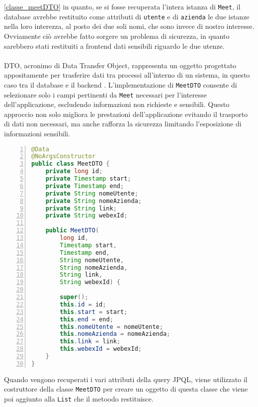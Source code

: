 \ref{classe_meetDTO} in quanto, se si fosse recuperata l'intera istanza di \texttt{Meet}, il database avrebbe restituito come attributi 
di \texttt{utente} e di \texttt{azienda} le due istanze nella loro interezza, al posto dei due soli nomi, che sono invece di nostro interesse. 
Ovviamente ciò avrebbe fatto sorgere un problema di sicurezza, in quanto sarebbero stati restituiti a frontend 
dati sensibili riguardo le due utenze.
\\
\\
DTO, acronimo di Data Transfer Object, rappresenta un oggetto progettato appositamente per trasferire dati tra processi 
all'interno di un sistema, in questo caso tra il database e il backend \cite{DataTransferObject}. L'implementazione di \texttt{MeetDTO} consente di selezionare 
solo i campi pertinenti da \texttt{Meet} necessari per l'interesse dell'applicazione, escludendo informazioni non richieste e sensibili.
Questo approccio non solo migliora le prestazioni dell'applicazione evitando il trasporto di dati non necessari, 
ma anche rafforza la sicurezza limitando l'esposizione di informazioni sensibili.
\begin{lstlisting}[language=java, frame=lines, basicstyle=\ttfamily\scriptsize, numbers=left, 
    label={classe_meetDTO}, caption={Classe MeetDTO}]
@Data
@NoArgsConstructor
public class MeetDTO {
    private long id;
    private Timestamp start;
    private Timestamp end;
    private String nomeUtente;
    private String nomeAzienda;
    private String link;
    private String webexId;
        
    public MeetDTO(
        long id, 
        Timestamp start, 
        Timestamp end, 
        String nomeUtente, 
        String nomeAzienda, 
        String link,
        String webexId) {
            
        super();
        this.id = id;
        this.start = start;
        this.end = end;
        this.nomeUtente = nomeUtente;
        this.nomeAzienda = nomeAzienda;
        this.link = link;
        this.webexId = webexId;
    }       
}
\end{lstlisting}
Quando vengono recuperati i vari attributi della query JPQL, 
viene utilizzato il costruttore della classe \texttt{MeetDTO} per creare un 
oggetto di questa classe che viene poi aggiunto alla \texttt{List} che il metoodo restituisce.